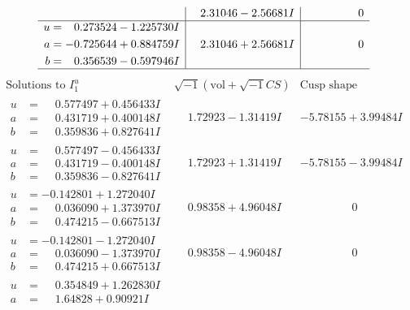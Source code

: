 \documentclass[1p]{elsarticle_modified}
\theoremstyle{definition}
\newcommand{\I}{\sqrt{-1}}
\begin{document}
$$\begin{array}{c|c|c}
 & \phantom{-}2.31046 - 2.56681 I & \phantom{-0.000000 } 0 \\ \hline\begin{aligned}
u &= \phantom{-}0.273524 - 1.225730 I \\
a &= -0.725644 + 0.884759 I \\
b &= \phantom{-}0.356539 - 0.597946 I\end{aligned}
 & \phantom{-}2.31046 + 2.56681 I & \phantom{-0.000000 } 0\\
 \hline 
 \end{array}$$\newpage$$\begin{array}{c|c|c}  
\text{Solutions to }I^u_{1}& \I (\text{vol} + \sqrt{-1}CS) & \text{Cusp shape}\\
 \hline 
\begin{aligned}
u &= \phantom{-}0.577497 + 0.456433 I \\
a &= \phantom{-}0.431719 + 0.400148 I \\
b &= \phantom{-}0.359836 + 0.827641 I\end{aligned}
 & \phantom{-}1.72923 - 1.31419 I & -5.78155 + 3.99484 I \\ \hline\begin{aligned}
u &= \phantom{-}0.577497 - 0.456433 I \\
a &= \phantom{-}0.431719 - 0.400148 I \\
b &= \phantom{-}0.359836 - 0.827641 I\end{aligned}
 & \phantom{-}1.72923 + 1.31419 I & -5.78155 - 3.99484 I \\ \hline\begin{aligned}
u &= -0.142801 + 1.272040 I \\
a &= \phantom{-}0.036090 + 1.373970 I \\
b &= \phantom{-}0.474215 - 0.667513 I\end{aligned}
 & \phantom{-}0.98358 + 4.96048 I & \phantom{-0.000000 } 0 \\ \hline\begin{aligned}
u &= -0.142801 - 1.272040 I \\
a &= \phantom{-}0.036090 - 1.373970 I \\
b &= \phantom{-}0.474215 + 0.667513 I\end{aligned}
 & \phantom{-}0.98358 - 4.96048 I & \phantom{-0.000000 } 0 \\ \hline\begin{aligned}
u &= \phantom{-}0.354849 + 1.262830 I \\
a &= \phantom{-}1.64828 + 0.90921 I \\

\end{aligned}
\end{array}$$
\end{document}
